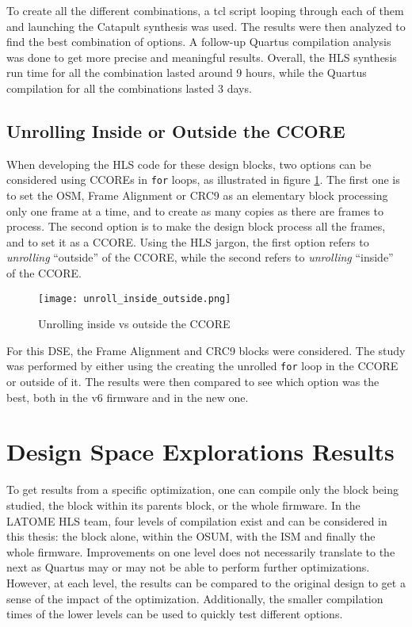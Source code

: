 To create all the different combinations, a tcl script looping through each of them and launching the Catapult synthesis was used. The results were then analyzed to find the best combination of options. A follow-up Quartus compilation analysis was done to get more precise and meaningful results. Overall, the HLS synthesis run time for all the combination lasted around 9 hours, while the Quartus compilation for all the combinations lasted 3 days.

\subsection{Unrolling Inside or Outside the CCORE}

When developing the HLS code for these design blocks, two options can be considered using CCOREs in \verb|for| loops, as illustrated in figure \ref{fig:unrolling-inside-outside}. The first one is to set the OSM, Frame Alignment or CRC9 as an elementary block processing only one frame at a time, and to create as many copies as there are frames to process. The second option is to make the design block process all the frames, and to set it as a CCORE. Using the HLS jargon, the first option refers to \textit{unrolling} ``outside'' of the CCORE, while the second refers to \textit{unrolling} ``inside'' of the CCORE.

\begin{figure}
    \centering
    \texttt{[image: unroll\_inside\_outside.png]}
    \caption{Unrolling inside vs outside the CCORE}
    \label{fig:unrolling-inside-outside}
\end{figure}

For this DSE, the Frame Alignment and CRC9 blocks were considered. The study was performed by either using the creating the unrolled \verb|for| loop in the CCORE or outside of it. The results were then compared to see which option was the best, both in the v6 firmware and in the new one.


\section{Design Space Explorations Results}

To get results from a specific optimization, one can compile only the block being studied, the block within its parents block, or the whole firmware. In the LATOME HLS team, four levels of compilation exist and can be considered in this thesis: the block alone, within the OSUM, with the ISM and finally the whole firmware. Improvements on one level does not necessarily translate to the next as Quartus may or may not be able to perform further optimizations. However, at each level, the results can be compared to the original design to get a sense of the impact of the optimization. Additionally, the smaller compilation times of the lower levels can be used to quickly test different options.

